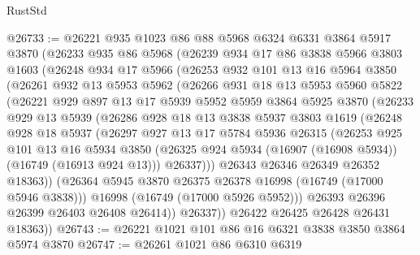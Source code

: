 \begin{lexlean}{RustStd}
\begin{coremodule}
@26733 := @26221
    @935
    @1023
    @86
    @88
    @5968
    @6324
    @6331
    @3864
    @5917
    @3870
    (@26233
      @935
      @86
      @5968
      (@26239
        @934
        @17
        @86
        @3838
        @5966
        @3803
        @1603
        (@26248
          @934
          @17
          @5966
          (@26253
            @932
            @101
            @13
            @16
            @5964
            @3850
            (@26261
              @932
              @13
              @5953
              @5962
              (@26266
                @931
                @18
                @13
                @5953
                @5960
                @5822
                (@26221
                  @929
                  @897
                  @13
                  @17
                  @5939
                  @5952
                  @5959
                  @3864
                  @5925
                  @3870
                  (@26233
                    @929
                    @13
                    @5939
                    (@26286
                      @928
                      @18
                      @13
                      @3838
                      @5937
                      @3803
                      @1619
                      (@26248
                        @928
                        @18
                        @5937
                        (@26297
                          @927
                          @13
                          @17
                          @5784
                          @5936
                          @26315
                          (@26253
                            @925
                            @101
                            @13
                            @16
                            @5934
                            @3850
                            (@26325 @924 @5934 (@16907 (@16908 @5934)) (@16749 (@16913 @924 @13)))
                            @26337)))
                      @26343
                      @26346
                      @26349
                      @26352
                      @18363))
                  (@26364 @5945 @3870 @26375 @26378 @16998 (@16749 (@17000 @5946 @3838)))
                  @16998
                  (@16749 (@17000 @5926 @5952)))
                @26393
                @26396
                @26399
                @26403
                @26408
                @26414))
            @26337))
        @26422
        @26425
        @26428
        @26431
        @18363))
@26743 := @26221 @1021 @101 @86 @16 @6321 @3838 @3850 @3864 @5974 @3870
@26747 := @26261 @1021 @86 @6310 @6319

\end{coremodule}
\end{lexlean}
